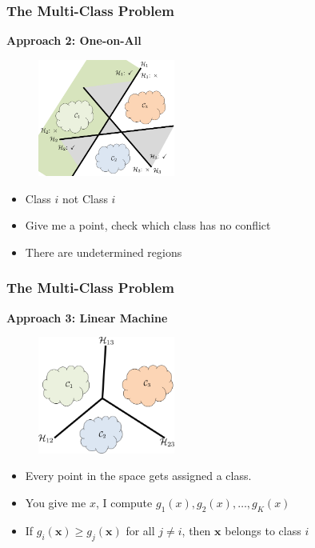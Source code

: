 \documentclass[9pt,dvipsnames]{beamer}
\begin{document}
\begin{frame}
	\frametitle{The Multi-Class Problem}
	\textbf{Approach 2: One-on-All}
	\begin{figure}[htbp]
		\centering
		\includegraphics[width=0.4\textwidth]{imgs/adv_overview_12.png}
	\end{figure}
	\begin{itemize}
		\item Class $i$ not Class $i$
		\item Give me a point, check which class has no conflict
		\item There are undetermined regions
	\end{itemize}
\end{frame}

\begin{frame}
	\frametitle{The Multi-Class Problem}
	\textbf{Approach 3: Linear Machine}
		\begin{figure}[htbp]
		\centering
		\includegraphics[width=0.4\textwidth]{imgs/adv_overview_13.png}
	\end{figure}
	\begin{itemize}
		\item Every point in the space gets assigned a class. 
		\item You give me \(x\), I compute \(g_{1}(x), g_{2}(x), \ldots, g_{K}(x)\)
		\item If \(g_{i}(\boldsymbol{x}) \geq g_{j}(\boldsymbol{x})\) for all \(j \neq i\), then \(\boldsymbol{x}\) belongs to class \(i\)
	\end{itemize}
\end{frame}
\end{document}
